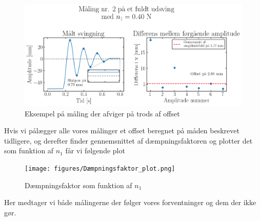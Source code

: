 \begin{figure}[htbp]
    \centering
    \includegraphics[width=0.8\linewidth,origin=c]{figures/n41.2-maks2.png}
    \caption{Eksempel på måling der afviger på trods af offset}
    \label{fig:dårlig_offset_graf}
\end{figure}

\noindent
Hvis vi pålægger alle vores målinger et offset beregnet på måden beskrevet tidligere, 
og derefter finder gennemsnittet af dæmpningsfaktoren og plotter det som funktion af $n_1$ får vi følgende plot

\newpage

\begin{figure}[h]
    \centering
    \texttt{[image: figures/Dæmpningsfaktor\_plot.png]}
    \caption{Dæmpningsfaktor som funktion af $n_1$}
    \label{fig:dæmpningsfaktor}
\end{figure}

\noindent
Her medtager vi både målingerne der følger vores forventninger og dem der ikke gør. 
